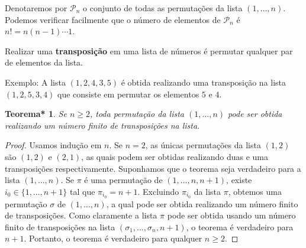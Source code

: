 \documentclass[12pt,a4paper]{report}
\newcommand{\tb}{\textbf}
\newcommand{\mc}{\mathcal}
\newtheorem{thm*}[thm]{Teorema*}
\begin{document}
Denotaremos por $\mc P_n$ o conjunto de todas as permutações da lista $(1,\ldots,n)$. Podemos verificar facilmente que o número de elementos de $\mc P_n$ é $n!=n(n-1)\cdots 1$.

Realizar uma \tb{transposição} em uma lista de números é permutar qualquer par de elementos da lista.

Exemplo: A lista $(1,2,4,3,5)$ é obtida realizando uma transposição na lista $(1,2,5,3,4)$ que consiste em permutar os elementos $5$ e $4$.

\begin{thm*}
  Se $n\ge 2$, toda permutação da lista $(1,\ldots,n)$ pode ser obtida realizando um número finito de transposições na lista.
\end{thm*}
\begin{proof}
  Usamos indução em $n$. Se $n=2$, as únicas permutações da lista $(1,2)$ são $(1,2)$ e $(2,1)$, as quais podem ser obtidas realizando duas e uma transposições respectivamente. Suponhamos que o teorema seja verdadeiro para a lista $(1,\ldots,n)$. Se $\pi$ é uma permutação de $(1,\ldots,n,n+1)$, existe $i_0\in\{1,\ldots,n+1\}$ tal que $\pi_{i_0}=n+1$.
  Excluindo $\pi_{i_0}$ da lista $\pi$, obtemos uma permutação $\sigma$ de $(1,\ldots,n)$, a qual pode ser obtida realizando um número finito de transposições. Como claramente a lista $\pi$ pode ser obtida usando um número finito de transposições na lista $(\sigma_1,\ldots,\sigma_n,n+1)$, o teorema é verdadeiro para $n+1$. Portanto, o teorema é verdadeiro para qualquer $n\ge 2$.
\end{proof}
\end{document}
